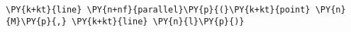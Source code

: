 \begin{Verbatim}[commandchars=\\\{\}]
    \PY{k+kt}{line} \PY{n+nf}{parallel}\PY{p}{(}\PY{k+kt}{point} \PY{n}{M}\PY{p}{,} \PY{k+kt}{line} \PY{n}{l}\PY{p}{)}
\end{Verbatim}
